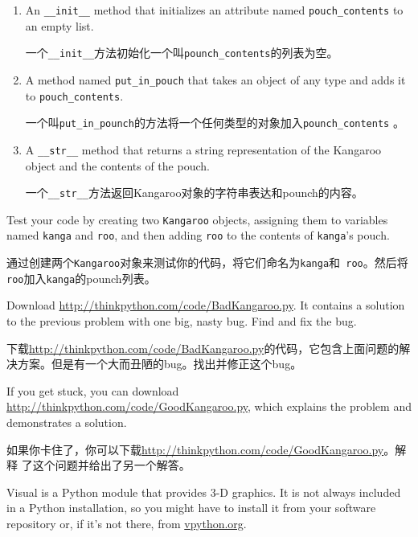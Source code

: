 \documentclass[10pt]{book}
\begin{document}
\begin{CJK}{UTF8}{gbsn}
\begin{exercise}
\begin{enumerate}

\item An \verb"__init__" method that initializes an attribute named 
\verb"pouch_contents" to an empty list.

一个\verb"__init__"方法初始化一个叫\verb"pounch_contents"的列表为空。

\item A method named \verb"put_in_pouch" that takes an object
of any type and adds it to \verb"pouch_contents".

一个叫\verb"put_in_pounch"的方法将一个任何类型的对象加入\verb"pounch_contents"
。

\item A \verb"__str__" method that returns a string representation
of the Kangaroo object and the contents of the pouch.

一个\verb"__str__"方法返回Kangaroo对象的字符串表达和pounch的内容。

\end{enumerate}
%
Test your code 
by creating two {\tt Kangaroo} objects, assigning them to variables
named {\tt kanga} and {\tt roo}, and then adding {\tt roo} to the
contents of {\tt kanga}'s pouch.

通过创建两个{\tt Kangaroo}对象来测试你的代码，将它们命名为{\tt kanga}和{\tt
roo}。然后将{\tt roo}加入{\tt kanga}的pounch列表。

Download \url{http://thinkpython.com/code/BadKangaroo.py}.  It contains
a solution to the previous problem with one big, nasty bug.
Find and fix the bug.

下载\url{http://thinkpython.com/code/BadKangaroo.py}的代码，它包含上面问题的解
决方案。但是有一个大而丑陋的bug。找出并修正这个bug。

If you get stuck, you can download
\url{http://thinkpython.com/code/GoodKangaroo.py}, which explains the
problem and demonstrates a solution.

如果你卡住了，你可以下载\url{http://thinkpython.com/code/GoodKangaroo.py}。解释
了这个问题并给出了另一个解答。

\end{exercise}




\begin{exercise}

Visual is a Python module that provides 3-D graphics.  It is
not always included in a Python installation, so you might have
to install it from your software repository or, if it's not there,
from \url{vpython.org}.


\end{exercise}
\end{CJK}
\end{document}
